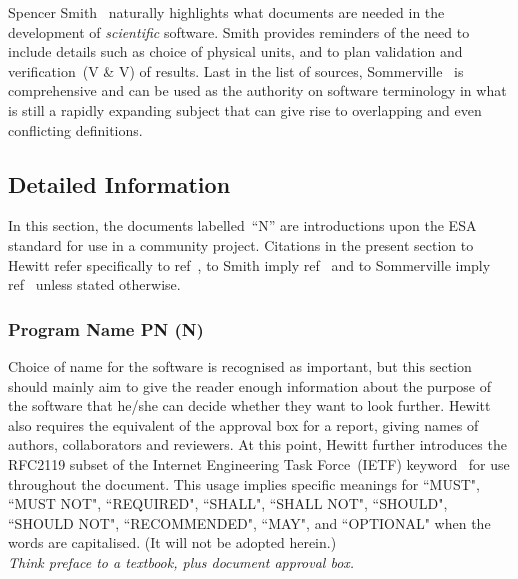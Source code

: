 Spencer Smith~\cite{Sm17Rati}
naturally highlights what documents are needed in the development of \emph{scientific} software.
Smith provides reminders of the need to include details such as choice of physical units,
and to plan validation and verification~(V \& V) of results.
Last in the list of sources, Sommerville~\cite{sommerville10} is comprehensive and can be used as
the authority on software terminology in what is still a rapidly expanding subject 
that can give rise to overlapping and even conflicting definitions.

%

\subsection{Detailed Information}\label{sec:detailedinfo}
In this section, the documents labelled~``N'' are introductions  upon the ESA standard
for use in a community project.
Citations in the present section to Hewitt refer specifically to ref~\cite[\S\,5]{hewitt}, to Smith imply ref~\cite[\S\,2.2]{Sm17Rati}
and to Sommerville imply ref~\cite[\S\,4]{sommerville10} unless stated otherwise.
\subsubsection{Program Name PN (N)}\label{sec:PN}
Choice of name for the software is recognised as important, but this section should mainly aim
to give the reader enough information about the purpose of the software
that he/she can decide whether they want to look further.  Hewitt also requires
the equivalent of the approval box for a report, giving names of authors, collaborators and reviewers.
At this point, Hewitt further introduces the RFC2119 subset of the Internet Engineering Task Force~(IETF) keyword~\cite{rfc2119}
for use throughout the document. This usage implies specific meanings for ``MUST", ``MUST NOT", ``REQUIRED", ``SHALL", ``SHALL
NOT", ``SHOULD", ``SHOULD NOT", ``RECOMMENDED",  ``MAY", and ``OPTIONAL" when the words are capitalised.
(It will not be adopted herein.) \\ 
\emph{Think preface to a textbook, plus document approval box.}
